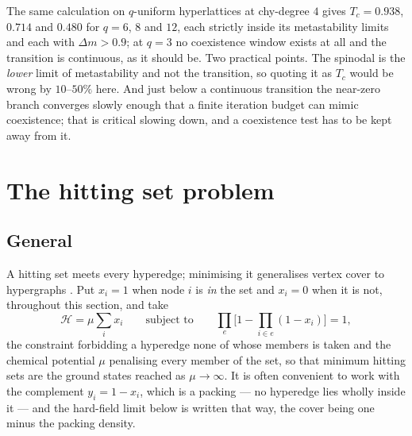 \documentclass[aps,pre,twocolumn,superscriptaddress,floatfix]{revtex4-2}
\begin{document}
The same calculation on $q$-uniform hyperlattices at chy-degree $4$ gives
$T_c=0.938$, $0.714$ and $0.480$ for $q=6$, $8$ and $12$, each strictly inside
its metastability limits and each with $\Delta m>0.9$; at $q=3$ no coexistence
window exists at all and the transition is continuous, as it should be. Two
practical points. The spinodal is the \emph{lower} limit of metastability and
not the transition, so quoting it as $T_c$ would be wrong by $10$--$50\%$ here.
And just below a continuous transition the near-zero branch converges slowly
enough that a finite iteration budget can mimic coexistence; that is critical
slowing down, and a coexistence test has to be kept away from it.

\section{The hitting set problem}
\label{sec:hs}

\subsection{General}

A hitting set meets every hyperedge; minimising it generalises vertex cover to
hypergraphs \cite{MT07}. Put $x_i=1$ when node $i$ is \emph{in} the set and
$x_i=0$ when it is not, throughout this section, and take
\begin{equation}
  \mathcal{H}=\mu\sum_i x_i
  \qquad\text{subject to}\qquad
  \prod_{e}\Big[1-\prod_{i\in e}(1-x_i)\Big]=1,
  \label{eq:Hhs}
\end{equation}
the constraint forbidding a hyperedge none of whose members is taken and the
chemical potential $\mu$ penalising every member of the set, so that minimum
hitting sets are the ground states reached as $\mu\to\infty$. It is often
convenient to work with the complement $y_i=1-x_i$, which is a packing --- no
hyperedge lies wholly inside it --- and the hard-field limit below is written
that way, the cover being one minus the packing density.
\end{document}
